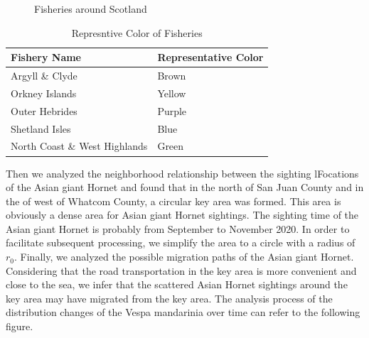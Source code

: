 \documentclass{mcmthesis}
\numberwithin{figure}{section}
\numberwithin{table}{section}
\begin{document}
\begin{figure}[H]
  \caption{Fisheries around Scotland}\label{FisheriesAround}
\end{figure}

\begin{table}[H]
\centering
\begin{tabular}{|l|l|}%
\hline  %
\textbf{Fishery Name}&\textbf{Representative Color}\\
\hline  %
Argyll \& Clyde & Brown\\
\hline %
Orkney Islands & Yellow\\
\hline %
Outer Hebrides  & Purple\\
\hline %
Shetland Isles & Blue\\
\hline %
North Coast \& West Highlands & Green\\
\hline %
\end{tabular}
\caption{Represntive Color of Fisheries}
\label{FisheryColor}
\end{table}

Then we analyzed the neighborhood relationship between the sighting lFocations of the Asian giant Hornet and found that in the north of San Juan County and in the  of west of Whatcom County, a circular key area was formed. This area is obviously a dense area for Asian giant Hornet sightings. The sighting time of the Asian giant Hornet is probably from September to November 2020. In order to facilitate subsequent processing, we simplify the area to a circle with a radius of $r_0$. Finally, we analyzed the possible migration paths of the Asian giant Hornet. Considering that the road transportation in the key area is more convenient and close to the sea, we infer that the scattered Asian Hornet sightings around the key area may have migrated from the key area. The analysis process of the distribution changes of the Vespa mandarinia over time can refer to the following figure.
\end{document}
